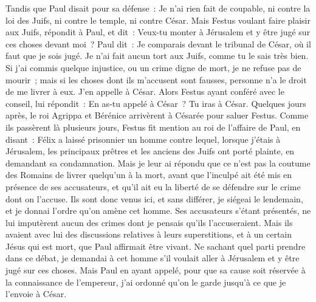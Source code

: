 \begin{multicols}{2}
Tandis que Paul disait pour sa défense~: Je n'ai rien fait de coupable, ni contre la loi des Juifs, ni contre le temple, ni contre César.
Mais Festus voulant faire plaisir aux Juifs, répondit à Paul, et dit~: Veux-tu monter à Jérusalem et y être jugé sur ces choses devant moi~?
Paul dit~: Je comparais devant le tribunal de César, où il faut que je sois jugé. Je n'ai fait aucun tort aux Juifs, comme tu le sais très bien.
Si j'ai commis quelque injustice, ou un crime digne de mort, je ne refuse pas de mourir~; mais si les choses dont ils m'accusent sont fausses, personne n'a le droit de me livrer à eux. J'en appelle à César.
Alors Festus ayant conféré avec le conseil, lui répondit~: En as-tu appelé à César~? Tu iras à César.
Quelques jours après, le roi Agrippa et Bérénice arrivèrent à Césarée pour saluer Festus.
Comme ils passèrent là plusieurs jours, Festus fit mention au roi de l'affaire de Paul, en disant~: Félix a laissé prisonnier un homme
contre lequel, lorsque j'étais à Jérusalem, les principaux prêtres et les anciens des Juifs ont porté plainte, en demandant sa condamnation.
Mais je leur ai répondu que ce n'est pas la coutume des Romains de livrer quelqu'un à la mort, avant que l'inculpé ait été mis en présence de ses accusateurs, et qu'il ait eu la liberté de se défendre sur le crime dont on l'accuse.
Ils sont donc venus ici, et sans différer, je siégeai le lendemain, et je donnai l'ordre qu'on amène cet homme.
Ses accusateurs s'étant présentés, ne lui imputèrent aucun des crimes dont je pensais qu'ils l'accuseraient.
Mais ils avaient avec lui des discussions relatives à leurs superstitions, et à un certain Jésus qui est mort, que Paul affirmait être vivant.
Ne sachant quel parti prendre dans ce débat, je demandai à cet homme s'il voulait aller à Jérusalem et y être jugé sur ces choses.
Mais Paul en ayant appelé, pour que sa cause soit réservée à la connaissance de l'empereur, j'ai ordonné qu'on le garde jusqu'à ce que je l'envoie à César.

\end{multicols}
